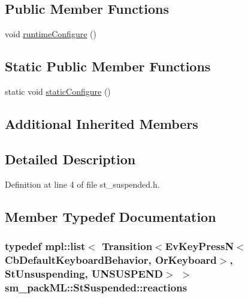 \subsection*{Public Member Functions}
\begin{DoxyCompactItemize}
\item 
void \hyperlink{structsm__packML_1_1StSuspended_aa5fedfb9adb0495a7280376ea388e7dc}{runtime\+Configure} ()
\end{DoxyCompactItemize}
\subsection*{Static Public Member Functions}
\begin{DoxyCompactItemize}
\item 
static void \hyperlink{structsm__packML_1_1StSuspended_a0c51815b7d6c3b2eca298a7fe5f4b504}{static\+Configure} ()
\end{DoxyCompactItemize}
\subsection*{Additional Inherited Members}


\subsection{Detailed Description}


Definition at line 4 of file st\+\_\+suspended.\+h.



\subsection{Member Typedef Documentation}
\subsubsection[{\texorpdfstring{reactions}{reactions}}]{\setlength{\rightskip}{0pt plus 5cm}typedef mpl\+::list$<$ Transition$<$Ev\+Key\+PressN$<$Cb\+Default\+Keyboard\+Behavior, {\bf Or\+Keyboard}$>$, {\bf St\+Unsuspending}, {\bf U\+N\+S\+U\+S\+P\+E\+ND}$>$ $>$ {\bf sm\+\_\+pack\+M\+L\+::\+St\+Suspended\+::reactions}}\hypertarget{structsm__packML_1_1StSuspended_a8bdc8aa52c97f3ac7a1bcfbe974a6f60}{}\label{structsm__packML_1_1StSuspended_a8bdc8aa52c97f3ac7a1bcfbe974a6f60}


